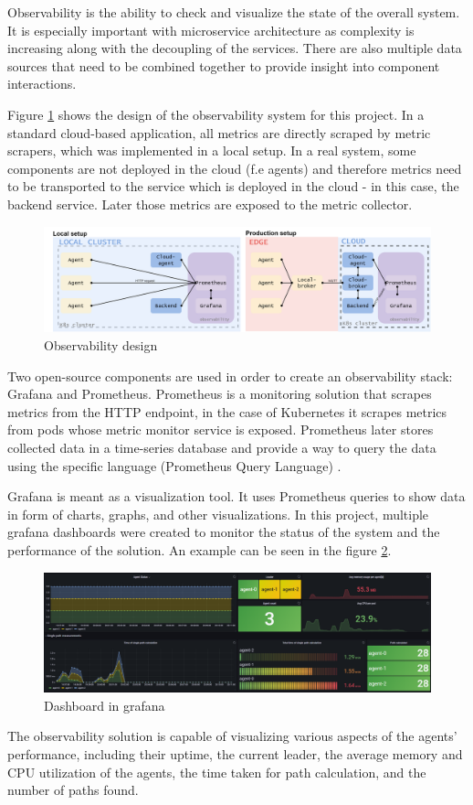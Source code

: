 Observability is the ability to check and visualize the state of the overall system. It is especially important with microservice architecture as complexity is increasing along with the decoupling of the services. There are also multiple data sources that need to be combined together to provide insight into component interactions. 

Figure \ref{fig:observability_system} shows the design of the observability system for this project. In a standard cloud-based application, all metrics are directly scraped by metric scrapers, which was implemented in a local setup. In a real system, some components are not deployed in the cloud (f.e agents) and therefore metrics need to be transported to the service which is deployed in the cloud - in this case, the backend service. Later those metrics are exposed to the metric collector.

\begin{figure}[H]
    \centering
    \includegraphics[width=\textwidth]{pictures/observability.png}
    \caption{Observability design}
    \label{fig:observability_system}
\end{figure}

Two open-source components are used in order to create an observability stack: Grafana and Prometheus. Prometheus is a monitoring solution that scrapes metrics from the HTTP endpoint, in the case of Kubernetes it scrapes metrics from pods whose metric monitor service is exposed. Prometheus later stores collected data in a time-series database and provide a way to query the data using the specific language (Prometheus Query Language) \cite{prometheus_docs}.

Grafana is meant as a visualization tool. It uses Prometheus queries to show data in form of charts, graphs, and other visualizations. In this project, multiple grafana dashboards were created to monitor the status of the system and the performance of the solution. An example can be seen in the figure \ref{fig:dashboard_grafana}.

\begin{figure}[H]
    \centering
    \includegraphics[width=\textwidth]{pictures/grafana.png}
    \caption{Dashboard in grafana}
    \label{fig:dashboard_grafana}
\end{figure}

The observability solution is capable of visualizing various aspects of the agents' performance, including their uptime, the current leader, the average memory and CPU utilization of the agents, the time taken for path calculation, and the number of paths found.

